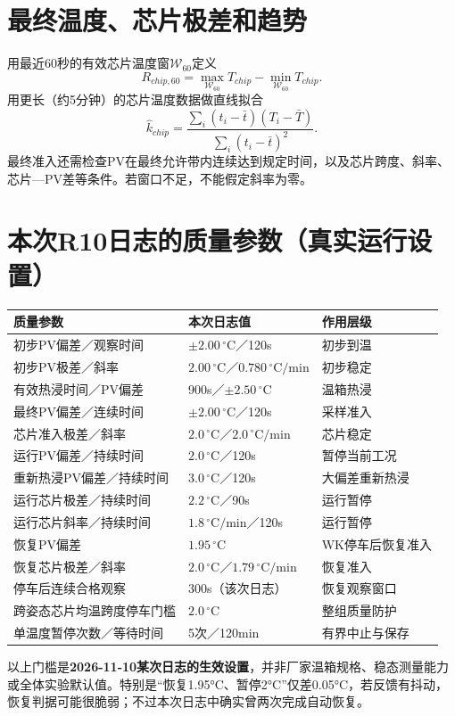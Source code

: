 \documentclass[UTF8,a4paper,11pt,oneside,openany,fontset=none]{ctexbook}
\newcommand{\degc}{\,^{\circ}\mathrm C}
\begin{document}
\section{最终温度、芯片极差和趋势}
用最近60秒的有效芯片温度窗$\mathcal W_{60}$定义
\begin{equation}
R_{chip,60}=\max_{\mathcal W_{60}}T_{chip}-\min_{\mathcal W_{60}}T_{chip}.
\end{equation}
用更长（约5分钟）的芯片温度数据做直线拟合
\begin{equation}
\hat k_{chip}=\frac{\sum_i(t_i-\bar t)(T_i-\bar T)}{\sum_i(t_i-\bar t)^2}.
\end{equation}
最终准入还需检查PV在最终允许带内连续达到规定时间，以及芯片跨度、斜率、芯片—PV差等条件。若窗口不足，不能假定斜率为零。

\section{本次R10日志的质量参数（真实运行设置）}
\begin{longtable}{p{6.6cm}p{3.5cm}p{3.4cm}}
\toprule
质量参数 & 本次日志值 & 作用层级\\\midrule\endhead
初步PV偏差／观察时间 & $\pm2.00\degc$／120s & 初步到温\\
初步PV极差／斜率 & $2.00\degc$／$0.780\degc/\mathrm{min}$ & 初步稳定\\
有效热浸时间／PV偏差 & 900s／$\pm2.50\degc$ & 温箱热浸\\
最终PV偏差／连续时间 & $\pm2.00\degc$／120s & 采样准入\\
芯片准入极差／斜率 & $2.0\degc$／$2.0\degc/\mathrm{min}$ & 芯片稳定\\
运行PV偏差／持续时间 & $2.0\degc$／120s & 暂停当前工况\\
重新热浸PV偏差／持续时间 & $3.0\degc$／120s & 大偏差重新热浸\\
运行芯片极差／持续时间 & $2.2\degc$／90s & 运行暂停\\
运行芯片斜率／持续时间 & $1.8\degc/\mathrm{min}$／120s & 运行暂停\\
恢复PV偏差 & $1.95\degc$ & WK停车后恢复准入\\
恢复芯片极差／斜率 & $2.0\degc$／$1.79\degc/\mathrm{min}$ & 恢复准入\\
停车后连续合格观察 & 300s（该次日志） & 恢复观察窗口\\
跨姿态芯片均温跨度停车门槛 & $2.0\degc$ & 整组质量防护\\
单温度暂停次数／等待时间 & 5次／120min & 有界中止与保存\\
\bottomrule
\end{longtable}
\begin{warningbox}
以上门槛是\textbf{2026-11-10某次日志的生效设置}，并非厂家温箱规格、稳态测量能力或全体实验默认值。特别是“恢复1.95°C、暂停2°C”仅差0.05°C，若反馈有抖动，恢复判据可能很脆弱；不过本次日志中确实曾两次完成自动恢复。
\end{warningbox}
\end{document}
